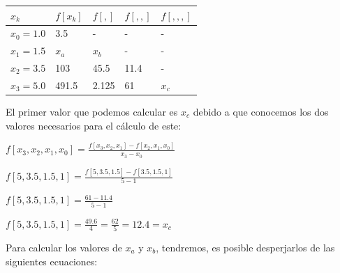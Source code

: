 \documentclass[english,notitlepage,letterpaper, 10pt]{article} %
\begin{document}
\begin{enumerate}
\begin{enumerate}
\begin{center}
      \begin{center}
        \begin{table}[H]

          \centering
          \begin{tabular}{|p{1.5cm}|p{1.5cm}|p{1.5cm}|p{1.5cm}|p{1.5cm}|}
    
           \hline  
           $x_k$ & $f[x_k]$ & $f[,]$ & $f[,,]$ & $f[,,,]$    \\ \hline
          $x_0 = 1.0$ & 3.5   & -      & -       & -         \\ \hline
          $x_1 = 1.5$ & $x_a$ & $x_b$  & -       & -         \\ \hline
          $x_2 = 3.5$ & 103   & 45.5   & 11.4    & -         \\ \hline
          $x_3 = 5.0$ & 491.5 & 2.125  & 61      & $x_c$     \\ \hline
    
          \end{tabular}
        \end{table}
      \end{center}

      \end{center}

      El primer valor que podemos calcular es $x_c$ debido a que conocemos los dos valores necesarios para el cálculo de este:

      \begin{center}
        \begin{math}
          f[x_3,x_2,x_1,x_0] = \displaystyle \frac{f[x_3,x_2,x_1] - f[x_2,x_1,x_0]}{x_3 - x_0}
        \end{math}

        \begin{math}
          f[5,3.5,1.5,1] = \displaystyle \frac{f[5,3.5,1.5] - f[3.5,1.5,1]}{5 - 1}
        \end{math}

        \begin{math}
          f[5,3.5,1.5,1] = \displaystyle \frac{61 - 11.4}{5 - 1}
        \end{math}

        \begin{math}
          f[5,3.5,1.5,1] = \displaystyle \frac{49.6}{4} = \frac{62}{5} = 12.4 = x_c
        \end{math}
      \end{center}

      Para calcular los valores de $x_a$ y $x_b$, tendremos, es posible desperjarlos de las siguientes ecuaciones:


\end{enumerate}
\end{enumerate}
\end{document}
